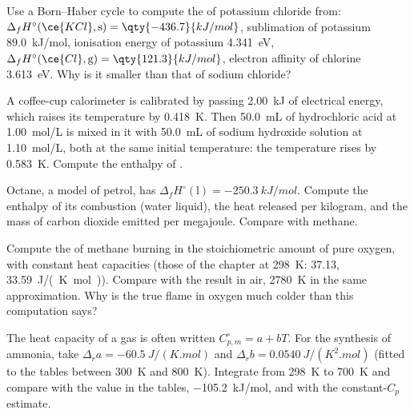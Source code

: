 \begin{exercise}[$\star\star$]\label{exo:b2:reaction-enthalpy:7}
Use a Born--Haber cycle to compute the  of potassium
chloride from: $\Delta_f H^\circ(\ce{KCl}, \text{s}) = \qty{-436.7}{kJ/mol}$,
sublimation of potassium \qty{89.0}{kJ/mol}, ionisation energy of
potassium \qty{4.341}{eV}, $\Delta_f H^\circ(\ce{Cl}, \text{g}) =
\qty{121.3}{kJ/mol}$, electron affinity of chlorine \qty{3.613}{eV}. Why is
it smaller than that of sodium chloride?
\end{exercise}

\begin{exercise}[$\star\star$]\label{exo:b2:reaction-enthalpy:8}
A coffee-cup calorimeter is calibrated by passing \qty{2.00}{kJ} of
electrical energy, which raises its temperature by \qty{0.418}{K}. Then
\qty{50.0}{mL} of hydrochloric acid at \qty{1.00}{mol/L} is mixed in it
with \qty{50.0}{mL} of sodium hydroxide solution at \qty{1.10}{mol/L},
both at the same initial temperature: the temperature rises by
\qty{0.583}{K}. Compute the enthalpy of .
\end{exercise}

\begin{exercise}[$\star\star$]\label{exo:b2:reaction-enthalpy:9}
Octane, a model of petrol, has $\Delta_f H^\circ(\text{l}) =
\qty{-250.3}{kJ/mol}$. Compute the enthalpy of its combustion (water
liquid), the heat released per kilogram, and the mass of carbon dioxide
emitted per megajoule. Compare with methane.
\end{exercise}

\begin{exercise}[$\star\star\star$]\label{exo:b2:reaction-enthalpy:10}
Compute the  of methane burning in the
stoichiometric amount of pure oxygen, with constant heat capacities (those
of the chapter at \qty{298}{K}:  37.13, 
\qty{33.59}{J/(K.mol)}). Compare with the result in air,
\qty{2780}{K} in the same approximation. Why is the true flame in oxygen
much colder than this computation says?
\end{exercise}

\begin{exercise}[$\star\star\star$]\label{exo:b2:reaction-enthalpy:11}
The heat capacity of a gas is often written $C_{p,m}^\circ = a + bT$. For
the synthesis of ammonia, take $\Delta_r a = \qty{-60.5}{J/(K.mol)}$ and
$\Delta_r b = \qty{0.0540}{J/(K^2.mol)}$ (fitted to the tables between
\qty{300}{K} and \qty{800}{K}). Integrate  from
\qty{298}{K} to \qty{700}{K} and compare with the value in the tables,
\qty{-105.2}{kJ/mol}, and with the constant-$C_p$ estimate.
\end{exercise}


